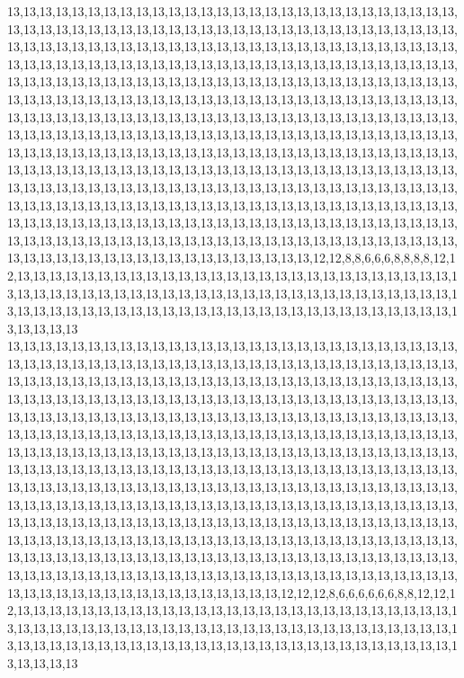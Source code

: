 13,13,13,13,13,13,13,13,13,13,13,13,13,13,13,13,13,13,13,13,13,13,13,13,13,13,13,13,13,13,13,13,13,13,13,13,13,13,13,13,13,13,13,13,13,13,13,13,13,13,13,13,13,13,13,13,13,13,13,13,13,13,13,13,13,13,13,13,13,13,13,13,13,13,13,13,13,13,13,13,13,13,13,13,13,13,13,13,13,13,13,13,13,13,13,13,13,13,13,13,13,13,13,13,13,13,13,13,13,13,13,13,13,13,13,13,13,13,13,13,13,13,13,13,13,13,13,13,13,13,13,13,13,13,13,13,13,13,13,13,13,13,13,13,13,13,13,13,13,13,13,13,13,13,13,13,13,13,13,13,13,13,13,13,13,13,13,13,13,13,13,13,13,13,13,13,13,13,13,13,13,13,13,13,13,13,13,13,13,13,13,13,13,13,13,13,13,13,13,13,13,13,13,13,13,13,13,13,13,13,13,13,13,13,13,13,13,13,13,13,13,13,13,13,13,13,13,13,13,13,13,13,13,13,13,13,13,13,13,13,13,13,13,13,13,13,13,13,13,13,13,13,13,13,13,13,13,13,13,13,13,13,13,13,13,13,13,13,13,13,13,13,13,13,13,13,13,13,13,13,13,13,13,13,13,13,13,13,13,13,13,13,13,13,13,13,13,13,13,13,13,13,13,13,13,13,13,13,13,13,13,13,13,13,13,13,13,13,13,13,13,13,13,13,13,13,13,13,13,13,13,13,13,13,13,13,13,13,13,13,13,13,13,13,13,13,13,13,13,13,13,13,13,13,13,13,13,13,13,13,13,13,13,13,13,13,13,13,13,13,13,13,13,13,13,13,13,13,13,13,13,13,13,13,13,13,13,13,13,13,13,13,13,13,13,13,13,13,13,13,13,13,13,13,13,13,13,13,13,13,13,12,12,8,8,6,6,6,8,8,8,8,12,12,13,13,13,13,13,13,13,13,13,13,13,13,13,13,13,13,13,13,13,13,13,13,13,13,13,13,13,13,13,13,13,13,13,13,13,13,13,13,13,13,13,13,13,13,13,13,13,13,13,13,13,13,13,13,13,13,13,13,13,13,13,13,13,13,13,13,13,13,13,13,13,13,13,13,13,13,13,13,13,13,13,13,13,13,13,13,13,13
13,13,13,13,13,13,13,13,13,13,13,13,13,13,13,13,13,13,13,13,13,13,13,13,13,13,13,13,13,13,13,13,13,13,13,13,13,13,13,13,13,13,13,13,13,13,13,13,13,13,13,13,13,13,13,13,13,13,13,13,13,13,13,13,13,13,13,13,13,13,13,13,13,13,13,13,13,13,13,13,13,13,13,13,13,13,13,13,13,13,13,13,13,13,13,13,13,13,13,13,13,13,13,13,13,13,13,13,13,13,13,13,13,13,13,13,13,13,13,13,13,13,13,13,13,13,13,13,13,13,13,13,13,13,13,13,13,13,13,13,13,13,13,13,13,13,13,13,13,13,13,13,13,13,13,13,13,13,13,13,13,13,13,13,13,13,13,13,13,13,13,13,13,13,13,13,13,13,13,13,13,13,13,13,13,13,13,13,13,13,13,13,13,13,13,13,13,13,13,13,13,13,13,13,13,13,13,13,13,13,13,13,13,13,13,13,13,13,13,13,13,13,13,13,13,13,13,13,13,13,13,13,13,13,13,13,13,13,13,13,13,13,13,13,13,13,13,13,13,13,13,13,13,13,13,13,13,13,13,13,13,13,13,13,13,13,13,13,13,13,13,13,13,13,13,13,13,13,13,13,13,13,13,13,13,13,13,13,13,13,13,13,13,13,13,13,13,13,13,13,13,13,13,13,13,13,13,13,13,13,13,13,13,13,13,13,13,13,13,13,13,13,13,13,13,13,13,13,13,13,13,13,13,13,13,13,13,13,13,13,13,13,13,13,13,13,13,13,13,13,13,13,13,13,13,13,13,13,13,13,13,13,13,13,13,13,13,13,13,13,13,13,13,13,13,13,13,13,13,13,13,13,13,13,13,13,13,13,13,13,13,13,13,13,13,13,13,13,13,13,13,13,13,13,13,13,13,13,13,12,12,12,8,6,6,6,6,6,6,8,8,12,12,12,13,13,13,13,13,13,13,13,13,13,13,13,13,13,13,13,13,13,13,13,13,13,13,13,13,13,13,13,13,13,13,13,13,13,13,13,13,13,13,13,13,13,13,13,13,13,13,13,13,13,13,13,13,13,13,13,13,13,13,13,13,13,13,13,13,13,13,13,13,13,13,13,13,13,13,13,13,13,13,13,13,13,13,13,13,13,13,13
